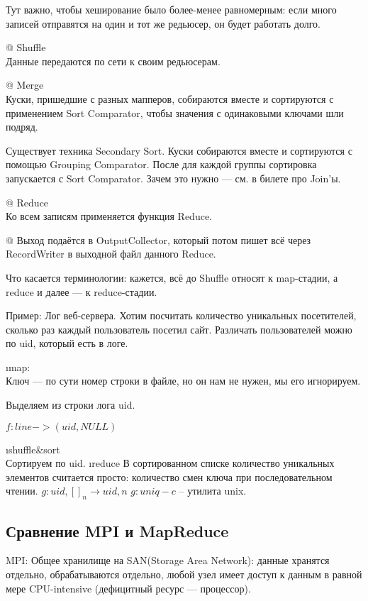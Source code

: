 \begin{el}[ul]
Тут важно, чтобы хеширование было более-менее равномерным: если много записей отправятся на один и тот же редьюсер, он будет работать долго.

@ Shuffle\\
Данные передаются по сети к своим редьюсерам.

@ Merge\\
Куски, пришедшие с разных мапперов, собираются вместе и сортируются с применением Sort Comparator, чтобы значения с одинаковыми ключами шли подряд.

Существует техника Secondary Sort. Куски собираются вместе и сортируются с помощью Grouping Comparator. После для каждой группы сортировка запускается с Sort Comparator. Зачем это нужно --- см. в билете про Join'ы.

@ Reduce\\
Ко всем записям применяется функция Reduce.

@ Выход подаётся в OutputCollector, который потом пишет всё через RecordWriter в выходной файл данного Reduce.

\end{el}

Что касается терминологии: кажется, всё до Shuffle относят к map-стадии, а reduce и далее --- к reduce-стадии.

Пример:
Лог веб-сервера. Хотим посчитать количество уникальных посетителей, сколько раз каждый пользователь посетил сайт. Различать пользователей можно по uid, который есть в логе. 
\begin{enumerate}
 \i map:\\
 Ключ --- по сути номер строки в файле, но он нам не нужен, мы его игнорируем.
 
 Выделяем из строки лога uid.
 
  $f: line->(uid, NULL)$
  
 \i shuffle\&sort\\
  Сортируем по uid. 
 \i reduce В сортированном списке количество уникальных элементов считается просто: количество смен ключа при последовательном чтении.
 $g: uid, []_n \rightarrow uid, n$
 $g: uniq -c$ --  утилита unix.
 
\end{enumerate}

\subsection{Сравнение MPI и MapReduce}
MPI: 
Общее хранилище на SAN(Storage Area Network): данные хранятся отдельно, обрабатываются отдельно, любой узел имеет доступ к данным в равной мере
CPU-intensive (дефицитный ресурс --- процессор).


